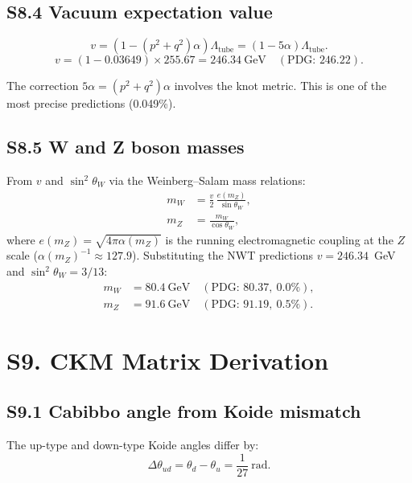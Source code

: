 \documentclass[11pt,a4paper]{article}
\begin{document}
\subsection{S8.4 Vacuum expectation value}

\begin{equation}
  v = (1 - (p^2+q^2)\alpha)\Lambda_{\text{tube}} = (1 - 5\alpha)\Lambda_{\text{tube}}.
\end{equation}
\begin{equation}
  v = (1 - 0.03649)\times 255.67 = 246.34~\text{GeV} \quad (\text{PDG: } 246.22).
\end{equation}

The correction $5\alpha = (p^2+q^2)\alpha$ involves the knot metric. This is one of the most precise predictions (0.049\%).

\subsection{S8.5 W and Z boson masses}

From $v$ and $\sin^2\theta_W$ via the Weinberg--Salam mass relations:
\begin{align}
  m_W &= \frac{v}{2}\,\frac{e(m_Z)}{\sin\theta_W}, \label{eq:mW}\\[4pt]
  m_Z &= \frac{m_W}{\cos\theta_W}, \label{eq:mZ}
\end{align}
where $e(m_Z) = \sqrt{4\pi\alpha(m_Z)}$ is the running electromagnetic coupling at the $Z$ scale ($\alpha(m_Z)^{-1} \approx 127.9$). Substituting the NWT predictions $v = 246.34$~GeV and $\sin^2\theta_W = 3/13$:
\begin{align}
  m_W &= 80.4~\text{GeV} \quad (\text{PDG: } 80.37,\ 0.0\%), \\
  m_Z &= 91.6~\text{GeV} \quad (\text{PDG: } 91.19,\ 0.5\%).
\end{align}

\section{S9. CKM Matrix Derivation}
\label{sec:S9}

\subsection{S9.1 Cabibbo angle from Koide mismatch}

The up-type and down-type Koide angles differ by:
\begin{equation}
  \Delta\theta_{ud} = \theta_d - \theta_u = \frac{1}{27}~\text{rad}.
\end{equation}
\end{document}
